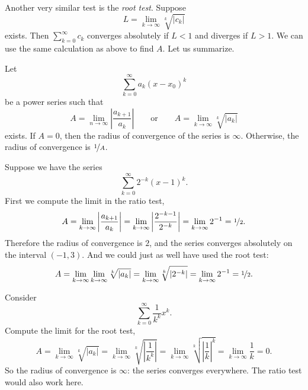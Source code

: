 Another very similar test is the \emph{root test}.
Suppose
\begin{equation*}
L = \lim_{k\to\infty} \sqrt[k]{\lvert c_k \rvert}
\end{equation*}
exists.  Then $\sum_{k=0}^\infty c_k$ converges absolutely if $L < 1$
and diverges if $L > 1$.  We can use the same calculation as above
to find $A$.
Let us summarize.

\begin{theorem}
Let
\begin{equation*}
\sum_{k=0}^\infty a_k {(x-x_0)}^k
\end{equation*}
be a power series such that
\begin{equation*}
A =
\lim_{n\to\infty}
\left \lvert
\frac{a_{k+1}}{a_k}
\right \rvert
\qquad \text{or} \qquad
A =
\lim_{k\to\infty} \sqrt[k]{\lvert a_k \rvert}
\end{equation*}
exists.  If $A = 0$, then the radius of convergence of the series
is $\infty$.  Otherwise, the radius of convergence is $\nicefrac{1}{A}$.
\end{theorem}

\begin{example}
Suppose we have the series
\begin{equation*}
\sum_{k=0}^\infty 2^{-k} {(x-1)}^k .
\end{equation*}
First we compute the limit in the ratio test,
\begin{equation*}
A = \lim_{k\to\infty} 
\left \lvert
\frac{a_{k+1}}{a_k}
\right \rvert
=
\lim_{k\to\infty} 
\left \lvert
\frac{2^{-k-1}}{2^{-k}}
\right \rvert
=
\lim_{k\to\infty} 
2^{-1} = \nicefrac{1}{2}.
\end{equation*}
Therefore the radius of convergence is $2$, and the series
converges absolutely on the interval $(-1,3)$.
And we could just as well have used the root test:
\begin{equation*}
A = \lim_{k\to\infty} 
\lim_{k\to\infty} 
\sqrt[k]{\lvert
a_k
\rvert}
=
\lim_{k\to\infty} 
\sqrt[k]{\lvert
2^{-k}
\rvert}
=
\lim_{k\to\infty} 
2^{-1}
=
\nicefrac{1}{2}.
\end{equation*}
\end{example}

\begin{example}
Consider
\begin{equation*}
\sum_{k=0}^\infty \frac{1}{k^k} {x}^k .
\end{equation*}
Compute the limit for the root test,
\begin{equation*}
A =
\lim_{k\to\infty} 
\sqrt[k]{\lvert a_k \rvert}
=
\lim_{k\to\infty} 
\sqrt[k]{
\left\lvert\frac{1}{k^k}\right\rvert}
=
\lim_{k\to\infty} 
\sqrt[k]{
{\left\lvert\frac{1}{k}\right\rvert}^{k}}
=
\lim_{k\to\infty} 
\frac{1}{k}
=
0 .
\end{equation*}
So the radius of convergence is $\infty$: the series
converges everywhere.  The ratio test would also work here.
\end{example}

